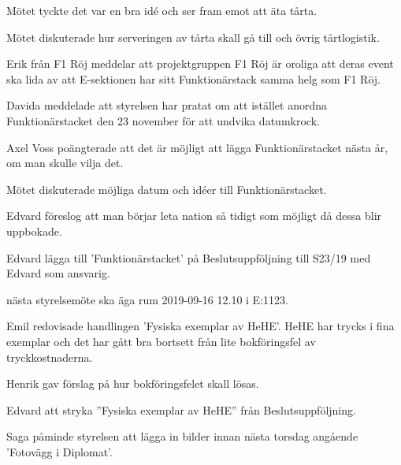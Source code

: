 \documentclass[10pt]{article}
\begin{document}
\begin{paragrafer}
Mötet tyckte det var en bra idé och ser fram emot att äta tårta.

Mötet diskuterade hur serveringen av tårta skall gå till och övrig tårtlogistik. 

\Mbabay


Erik från F1 Röj meddelar att projektgruppen F1 Röj är oroliga att deras event ska lida av att E-sektionen har sitt Funktionärstack samma helg som F1 Röj. 

Davida meddelade att styrelsen har pratat om att istället anordna Funktionärstacket den 23 november för att undvika datumkrock. 

Axel Voss poängterade att det är möjligt att lägga Funktionärstacket nästa år, om man skulle vilja det. 

Mötet diskuterade möjliga datum och idéer till Funktionärstacket. 

Edvard föreslog att man börjar leta nation så tidigt som möjligt då dessa blir uppbokade. 

Edvard \ypa lägga till 'Funktionärstacket' på Beslutsuppföljning till S23/19 med Edvard som ansvarig. 

\Mbaby

\Mba nästa styrelsemöte ska äga rum 2019-09-16 12.10 i E:1123.


Emil redovisade handlingen 'Fysiska exemplar av HeHE'. HeHE har trycks i fina exemplar och det har gått bra bortsett från lite bokföringsfel av tryckkostnaderna. 

Henrik gav förslag på hur bokföringsfelet skall lösas.  



Edvard \ypa att stryka ''Fysiska exemplar av HeHE'' från Beslutsuppföljning. 

\Mbaby

Saga påminde styrelsen att lägga in bilder innan nästa torsdag angående 'Fotovägg i Diplomat'.





\end{paragrafer}
\end{document}
